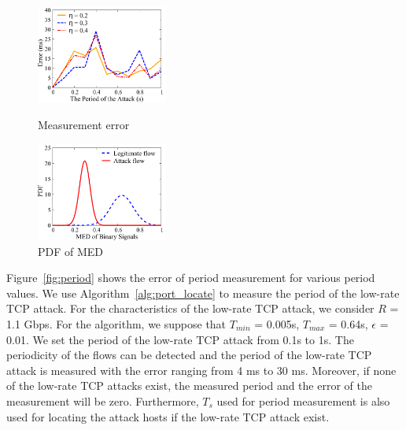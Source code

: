 \begin{figure}
\vspace{0in}


\begin{minipage}[t]{0.49\linewidth}
\centering
\includegraphics[width=1.7in]{Evaluation/period.pdf}
\caption{\small{Measurement error}}
\label{fig:period}
\end{minipage}
\begin{minipage}[t]{0.49\linewidth}
\centering
\includegraphics[width=1.7in]{Evaluation/distribution.pdf}
\caption{\small{PDF of MED}}
\label{fig:PDF}
\end{minipage}
\vspace{-0.2in}
\end{figure}

Figure~\ref{fig:period} shows the error of period measurement for various period values. We use Algorithm~\ref{alg:port_locate} to measure the period of the low-rate TCP attack. For the characteristics of the low-rate TCP attack, we consider $R $ = 1.1 Gbps. For the algorithm, we suppose that $T_{min}$  = 0.005s, $T_{max}$ = 0.64s, $\epsilon$ = 0.01. We set the period of the low-rate TCP attack from 0.1s to 1s. The periodicity of the flows can be detected and the period of the low-rate TCP attack is measured with the error ranging from 4 ms to 30 ms. Moreover, if none of the low-rate TCP attacks exist, the measured period and the error of the measurement will be zero. Furthermore, $T_s$ used for period measurement is also used for locating the attack hosts if the low-rate TCP attack exist.


